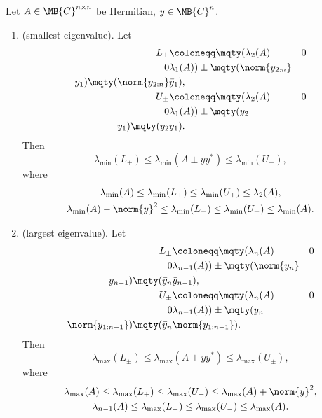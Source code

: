 \documentclass[nobib]{my-handout}
\newcommand{\lmin}{\lambda_{\min}}
\newcommand{\lmax}{\lambda_{\max}}
\begin{document}
\begin{theorem}
	\label{thm:ipsen}
	Let $A \in \MB{C}^{n \times n}$ be Hermitian, $y \in \MB{C}^n$.
	\begin{enumerate}
		\item (smallest eigenvalue). Let
			\begin{align*}
				L_{\pm} &\coloneqq \mqty(\lambda_2(A) & 0 \\ 0 & \lambda_1(A)) \pm
				\mqty(\norm{y_{2:n}} \\ y_1) \mqty(\norm{y_{2:n}} & \bar{y}_1), \\
				U_{\pm} &\coloneqq \mqty(\lambda_2(A) & 0 \\ 0 & \lambda_1(A)) \pm
				\mqty(y_2 \\ y_1) \mqty(\bar{y}_2 & \bar{y}_1).
			\end{align*}
			Then
			\begin{equation*}
				\lmin(L_{\pm}) \le \lmin(A \pm y y^\ast) \le \lmin(U_{\pm}),
			\end{equation*}
			where
			\begin{gather*}
				\lmin(A) \le \lmin(L_{+}) \le \lmin(U_{+}) \le \lambda_2(A), \\
				\lmin(A) - \norm{y}^2 \le \lmin(L_{-}) \le \lmin(U_{-}) \le \lmin(A).
			\end{gather*}
		\item (largest eigenvalue). Let
			\begin{align*}
				L_{\pm} &\coloneqq \mqty(\lambda_n(A) & 0 \\ 0 & \lambda_{n-1}(A)) \pm
				\mqty(\norm{y_n} \\ y_{n-1}) \mqty(\bar{y}_n & \bar{y}_{n-1}), \\
				U_{\pm} &\coloneqq \mqty(\lambda_n(A) & 0 \\ 0 & \lambda_{n-1}(A)) \pm
				\mqty(y_n \\ \norm{y_{1:n-1}}) \mqty(\bar{y}_n & \norm{y_{1:n-1}}).
			\end{align*}
			Then
			\begin{equation*}
				\lmax(L_{\pm}) \le \lmax(A \pm y y^\ast) \le \lmax(U_{\pm}),
			\end{equation*}
			where
			\begin{gather*}
				\lmax(A) \le \lmax(L_{+}) \le \lmax(U_{+}) \le \lmax(A)+\norm{y}^2, \\
				\lambda_{n-1}(A) \le \lmax(L_{-}) \le \lmax(U_{-}) \le \lmax(A).
			\end{gather*}
	\end{enumerate}
\end{theorem}
\end{document}
